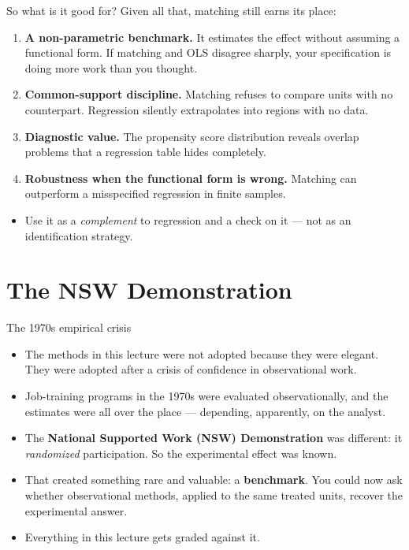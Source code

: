 \documentclass[
  11pt,
  ignorenonframetext,
  aspectratio=169,
]{beamer}
\providecommand{\tightlist}{%
  \setlength{\itemsep}{0pt}\setlength{\parskip}{0pt}}
\begin{document}
\begin{frame}{So what is it good for?}
\protect{}\label{so-what-is-it-good-for}
Given all that, matching still earns its place:

\begin{enumerate}
\tightlist
\item
  \textbf{A non-parametric benchmark.} It estimates the effect without
  assuming a functional form. If matching and OLS disagree sharply, your
  specification is doing more work than you thought.
\item
  \textbf{Common-support discipline.} Matching refuses to compare units
  with no counterpart. Regression silently extrapolates into regions
  with no data.
\item
  \textbf{Diagnostic value.} The propensity score distribution reveals
  overlap problems that a regression table hides completely.
\item
  \textbf{Robustness when the functional form is wrong.} Matching can
  outperform a misspecified regression in finite samples.
\end{enumerate}

\vspace{0.3em}

\begin{itemize}
\tightlist
\item
  Use it as a \emph{complement} to regression and a check on it --- not
  as an identification strategy.
\end{itemize}
\end{frame}

\section{The NSW Demonstration}\label{the-nsw-demonstration}

\begin{frame}{The 1970s empirical crisis}
\protect{}\label{the-1970s-empirical-crisis}
\begin{itemize}
\tightlist
\item
  The methods in this lecture were not adopted because they were
  elegant. They were adopted after a crisis of confidence in
  observational work.
\item
  Job-training programs in the 1970s were evaluated observationally, and
  the estimates were all over the place --- depending, apparently, on
  the analyst.
\item
  The \textbf{National Supported Work (NSW) Demonstration} was
  different: it \emph{randomized} participation. So the experimental
  effect was known.
\item
  That created something rare and valuable: a \textbf{benchmark}. You
  could now ask whether observational methods, applied to the same
  treated units, recover the experimental answer.
\item
  Everything in this lecture gets graded against it.
\end{itemize}
\end{frame}
\end{document}

